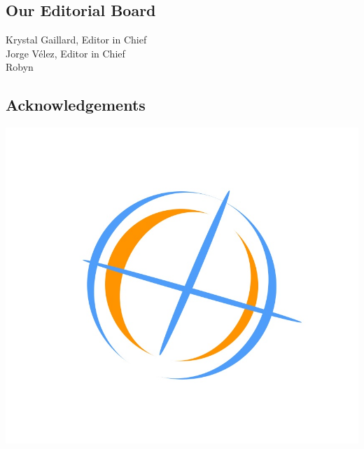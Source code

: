 \documentclass[journal,noindent,headline,12pt]{paper}
\begin{document}
\clearpage
\journalpart[Acknowledgements]{}
\begin{center}
	\chapter{\textbf{Our Editorial Board}}
\end{center}
\begin{center}
Krystal Gaillard, Editor in Chief\\	
Jorge Vélez, Editor in Chief\\
Robyn\\
\end{center}



\begin{center}
	\chapter{\textbf{Acknowledgements}}
\end{center}
\lipsum[1]

\begin{center}
	\includegraphics[scale=0.2]{logo1}
\end{center}




%

\end{document}
